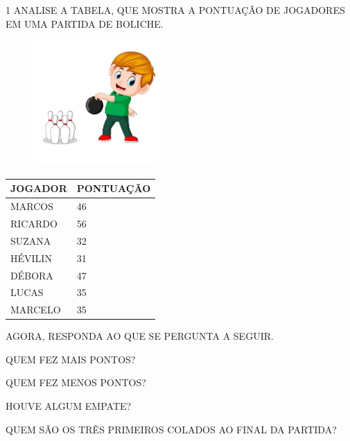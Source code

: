 \num{1} ANALISE A TABELA, QUE MOSTRA A PONTUAÇÃO DE JOGADORES EM UMA PARTIDA DE
BOLICHE.


\begin{figure}[htpb!]
\centering
\includegraphics[width=1.88542in,height=1.88542in]{media/image95.jpg}
\end{figure}

\begin{longtable}[]{@{}ll@{}}
\toprule
JOGADOR & PONTUAÇÃO\tabularnewline
\midrule
\endhead
MARCOS & 46\tabularnewline
RICARDO & 56\tabularnewline
SUZANA & 32\tabularnewline
HÉVILIN & 31\tabularnewline
DÉBORA & 47\tabularnewline
LUCAS & 35\tabularnewline
MARCELO & 35\tabularnewline
\bottomrule
\end{longtable}

AGORA, RESPONDA AO QUE SE PERGUNTA A SEGUIR.

\begin{escolha}
\item QUEM FEZ MAIS PONTOS?


\item QUEM FEZ MENOS PONTOS?


\item HOUVE ALGUM EMPATE?


\item QUEM SÃO OS TRÊS PRIMEIROS COLADOS AO FINAL DA PARTIDA?

\end{escolha}

